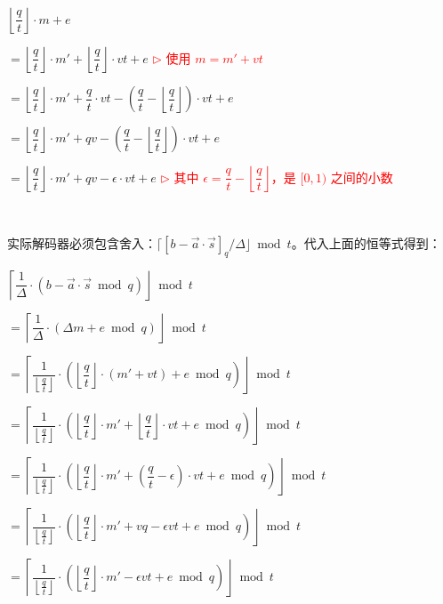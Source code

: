$\left\lfloor\dfrac{q}{t}\right\rfloor\cdot m + e $

$= \left\lfloor\dfrac{q}{t}\right\rfloor\cdot m' + \left\lfloor\dfrac{q}{t}\right\rfloor\cdot vt + e$ \textcolor{red}{ $\rhd$ 使用 $m = m' + vt$}

$= \left\lfloor\dfrac{q}{t}\right\rfloor\cdot m' + \dfrac{q}{t}\cdot vt - \left(\dfrac{q}{t} - \left\lfloor\dfrac{q}{t}\right\rfloor\right)\cdot vt + e$  

$= \left\lfloor\dfrac{q}{t}\right\rfloor\cdot m' + qv - \left(\dfrac{q}{t} - \left\lfloor\dfrac{q}{t}\right\rfloor\right)\cdot vt + e$

$= \left\lfloor\dfrac{q}{t}\right\rfloor\cdot m' + qv - \epsilon \cdot vt + e$ \textcolor{red}{ $\rhd$ 其中 $\epsilon = \dfrac{q}{t} - \left\lfloor\dfrac{q}{t}\right\rfloor$，是 $[0, 1)$ 之间的小数}

$ $

实际解码器必须包含舍入：$\lceil [b-\vec a\cdot\vec s]_q/\Delta\rfloor\bmod t$。代入上面的恒等式得到：



$\left\lceil\dfrac{1}{\Delta} \cdot \left(b - \vec{a}\cdot\vec{s} \bmod q\right)\right\rfloor \bmod t$

$= \left\lceil\dfrac{1}{\Delta} \cdot \left(\Delta m + e \bmod q\right)\right\rfloor \bmod t$

$= \left\lceil\dfrac{1}{\left\lfloor\frac{q}{t}\right\rfloor} \cdot \left(\left\lfloor\dfrac{q}{t}\right\rfloor \cdot (m' + vt) + e \bmod q\right)\right\rfloor \bmod t$

$= \left\lceil\dfrac{1}{\left\lfloor\frac{q}{t}\right\rfloor} \cdot \left(\left\lfloor\dfrac{q}{t}\right\rfloor \cdot m' + \left\lfloor\dfrac{q}{t}\right\rfloor\cdot vt + e \bmod q\right)\right\rfloor \bmod t$

$= \left\lceil\dfrac{1}{\left\lfloor\frac{q}{t}\right\rfloor} \cdot \left(\left\lfloor\dfrac{q}{t}\right\rfloor \cdot m' + \left(\dfrac{q}{t} - \epsilon \right)\cdot vt + e \bmod q\right)\right\rfloor \bmod t$

$= \left\lceil\dfrac{1}{\left\lfloor\frac{q}{t}\right\rfloor} \cdot \left(\left\lfloor\dfrac{q}{t}\right\rfloor \cdot m' + vq - \epsilon vt + e \bmod q\right)\right\rfloor \bmod t$


$= \left\lceil\dfrac{1}{\left\lfloor\frac{q}{t}\right\rfloor} \cdot \left(\left\lfloor\dfrac{q}{t}\right\rfloor\cdot m'  - \epsilon vt + e \bmod q \right)\right\rfloor \bmod t$ 

$ $

